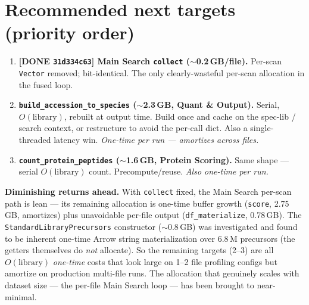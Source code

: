 \documentclass[11pt]{article}
\newcommand{\code}[1]{\texttt{\small #1}}
\begin{document}
\section{Recommended next targets (priority order)}
\begin{enumerate}
  \item \textcolor{hi}{\textbf{[DONE \code{31d334c63}] Main Search \code{collect}
  ($\sim$0.2\,GB/file).}} Per-scan \code{Vector} removed; bit-identical. The only
  clearly-wasteful per-scan allocation in the fused loop.
  \item \textbf{\code{build\_accession\_to\_species} ($\sim$2.3\,GB, Quant \& Output).}
  Serial, $O(\text{library})$, rebuilt at output time. Build once and cache on the
  spec-lib / search context, or restructure to avoid the per-call dict. Also a
  single-threaded latency win. \emph{One-time per run --- amortizes across files.}
  \item \textbf{\code{count\_protein\_peptides} ($\sim$1.6\,GB, Protein Scoring).}
  Same shape --- serial $O(\text{library})$ count. Precompute/reuse.
  \emph{Also one-time per run.}
\end{enumerate}
\noindent\textbf{Diminishing returns ahead.} With \code{collect} fixed, the Main
Search per-scan path is lean --- its remaining allocation is one-time buffer
growth (\code{score}, 2.75\,GB, amortizes) plus unavoidable per-file output
(\code{df\_materialize}, 0.78\,GB). The \code{StandardLibraryPrecursors}
constructor ($\sim$0.8\,GB) was investigated and found to be inherent one-time
Arrow string materialization over 6.8\,M precursors (the getters themselves do
\emph{not} allocate). So the remaining targets (2--3) are all $O(\text{library})$
\emph{one-time} costs that look large on 1--2 file profiling configs but amortize
on production multi-file runs. The allocation that genuinely scales with dataset
size --- the per-file Main Search loop --- has been brought to near-minimal.
\end{document}
